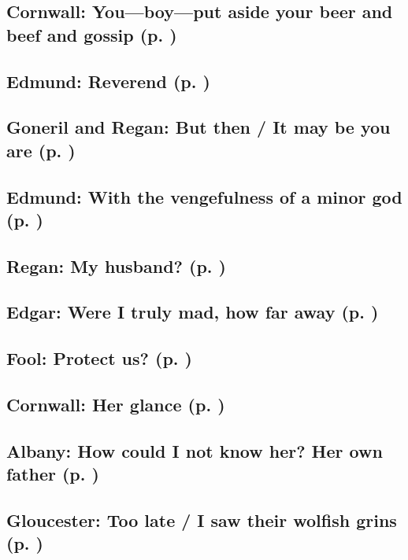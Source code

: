 \subsection{Cornwall: You---boy---put aside your beer and beef and gossip (p. \pageref{ch:lear_ak})}

\subsection{Edmund: Reverend (p. \pageref{ch:lear_al})}

\subsection{Goneril and Regan: But then / It may be you are (p. \pageref{ch:lear_am})}

\subsection{Edmund: With the vengefulness of a minor god (p. \pageref{ch:lear_an})}

\subsection{Regan: My husband? (p. \pageref{ch:lear_ao})}

\subsection{Edgar: Were I truly mad, how far away (p. \pageref{ch:lear_ap})}

\subsection{Fool: Protect us? (p. \pageref{ch:lear_aq})}

\subsection{Cornwall: Her glance (p. \pageref{ch:lear_ar})}

\subsection{Albany: How could I not know her? Her own father (p. \pageref{ch:lear_as})}

\subsection{Gloucester: Too late / I saw their wolfish grins (p. \pageref{ch:lear_at})}

